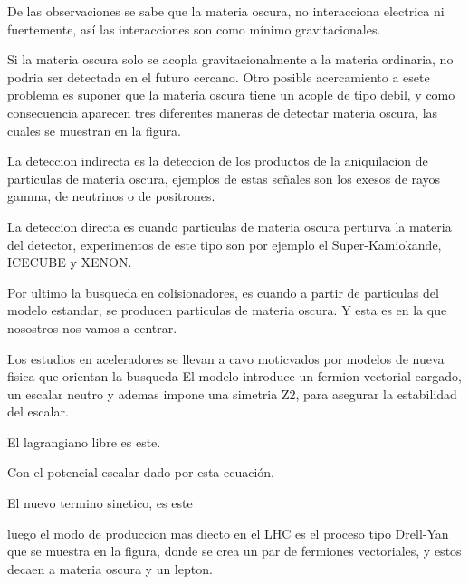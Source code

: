 \documentclass[12pt,letterpaper]{article}
\newcounter{example}[enumi]
\begin{document}
	
	\begin{tcolorbox}[title= Slide \arabic{example} ]
	De las observaciones se sabe que la materia oscura, no interacciona electrica ni fuertemente, así las interacciones son como mínimo gravitacionales. 

	Si la materia oscura solo se acopla gravitacionalmente a la materia ordinaria, no podria ser detectada en el futuro cercano. Otro posible acercamiento a esete problema es suponer que la materia oscura tiene un acople de tipo debil, y como consecuencia aparecen tres diferentes maneras de detectar materia oscura, las cuales se muestran en la figura.

	La deteccion indirecta es la deteccion de los productos de la aniquilacion de particulas de materia oscura, ejemplos de estas señales son los exesos de rayos gamma, de neutrinos o  de positrones.

	La deteccion directa es cuando particulas de materia oscura perturva la materia del detector, experimentos de este tipo son por ejemplo el Super-Kamiokande, ICECUBE y XENON.
	
	Por ultimo la busqueda en colisionadores, es cuando a partir de particulas del modelo estandar, se producen particulas de materia oscura. Y esta es en la que nosostros nos vamos a centrar.
	\end{tcolorbox}

	\begin{tcolorbox}[title= Slide \arabic{example} ]
	Los estudios en aceleradores se llevan a cavo  moticvados por modelos de nueva fisica que orientan la busqueda
	El modelo introduce un fermion vectorial cargado, un escalar neutro y ademas impone una simetria Z2, para asegurar la estabilidad del escalar.
	
	El lagrangiano libre es este.
	
	Con el potencial escalar dado por esta ecuación.
	\end{tcolorbox}

	\begin{tcolorbox}[title= Slide \arabic{example} ]%
	El nuevo termino sinetico, es este
	
	luego el modo de produccion mas diecto en el LHC es el proceso tipo Drell-Yan que se muestra en la figura, donde se crea un par de fermiones vectoriales, y estos decaen a materia oscura y un lepton.
		
	\end{tcolorbox}
\end{document}
